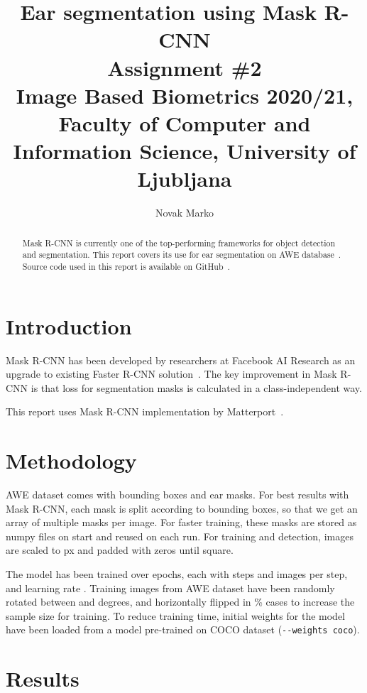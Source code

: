 \documentclass[9pt]{IEEEtran}
\title{\vspace{0ex} %
Ear segmentation using Mask R-CNN
\\ \large{Assignment \#2}\\ \normalsize{Image Based Biometrics 2020/21, Faculty of Computer and Information Science, University of Ljubljana}}
\author{ %
Novak Marko
\vspace{-4.0ex}
}
\begin{document}
\maketitle

\begin{abstract}
Mask R-CNN is currently one of the top-performing frameworks for object detection and segmentation. This report covers its use for ear segmentation on AWE database~\cite{DBLP:journals/corr/EmersicSP16}. Source code used in this report is available on GitHub~\cite{github}.
\end{abstract}

\section{Introduction}
Mask R-CNN has been developed by researchers at Facebook AI Research as an upgrade to existing Faster R-CNN solution~\cite{DBLP:journals/corr/HeGDG17}. The key improvement in Mask R-CNN is that loss for segmentation masks is calculated in a class-independent way.

This report uses Mask R-CNN implementation by Matterport~\cite{matterport_maskrcnn_2017}.

\section{Methodology}
AWE dataset comes with bounding boxes and ear masks. For best results with Mask R-CNN, each mask is split according to bounding boxes, so that we get an array of multiple masks per image. For faster training, these masks are stored as numpy files on start and reused on each run. For training and detection, images are scaled to px and padded with zeros until square.

The model has been trained over  epochs, each with  steps and  images per step, and learning rate . Training images from AWE dataset have been randomly rotated between  and  degrees, and horizontally flipped in \% cases to increase the sample size for training. To reduce training time, initial weights for the model have been loaded from a model pre-trained on COCO dataset (\texttt{-{}-weights coco}).

\section{Results}
\end{document}
